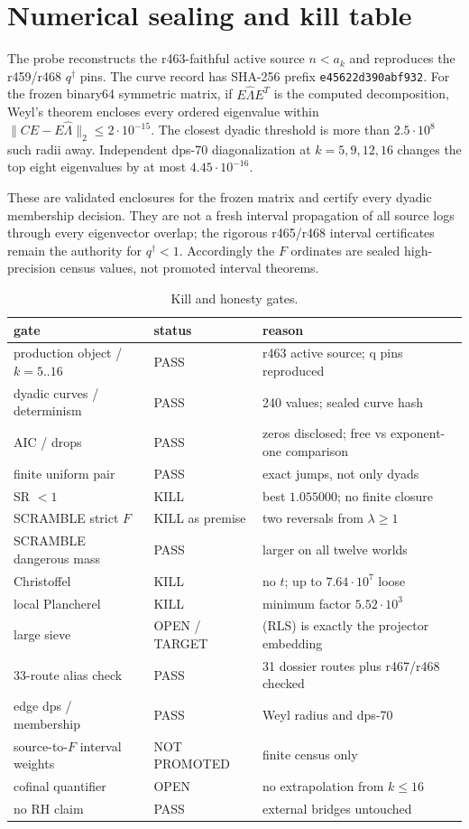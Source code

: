 \documentclass[11pt]{article}
\theoremstyle{remark}
\newcommand{\code}[1]{\nolinkurl{#1}}
\newcommand{\qdag}{q^\dagger}
\begin{document}
\section{Numerical sealing and kill table}

The probe reconstructs the r463-faithful active source $n<a_k$ and
reproduces the r459/r468 $\qdag$ pins.  The curve record has SHA-256
prefix \code{e45622d390abf932}.  For the frozen binary64 symmetric
matrix, if $E\widehat\Lambda E^T$ is the computed decomposition, Weyl's
theorem encloses every ordered eigenvalue within
$\|CE-E\widehat\Lambda\|_2\le2\cdot10^{-15}$.  The closest dyadic
threshold is more than $2.5\cdot10^8$ such radii away.  Independent
dps-70 diagonalization at $k=5,9,12,16$ changes the top eight
eigenvalues by at most $4.45\cdot10^{-16}$.

These are validated enclosures for the frozen matrix and certify every
dyadic membership decision.  They are not a fresh interval propagation
of all source logs through every eigenvector overlap; the rigorous
r465/r468 interval certificates remain the authority for $\qdag<1$.
Accordingly the $F$ ordinates are sealed high-precision census values,
not promoted interval theorems.

\begin{table}[ht]
\centering\small
\caption{Kill and honesty gates.}
\begin{tabular}{@{}lll@{}}
\toprule
gate&status&reason\\
\midrule
production object / $k=5..16$&PASS&r463 active source; q pins reproduced\\
dyadic curves / determinism&PASS&240 values; sealed curve hash\\
AIC / drops&PASS&zeros disclosed; free vs exponent-one comparison\\
finite uniform pair&PASS&exact jumps, not only dyads\\
SR $<1$&KILL&best $1.055000$; no finite closure\\
SCRAMBLE strict $F$&KILL as premise&two reversals from $\lambda\ge1$\\
SCRAMBLE dangerous mass&PASS&larger on all twelve worlds\\
Christoffel&KILL&no $t$; up to $7.64\cdot10^7$ loose\\
local Plancherel&KILL&minimum factor $5.52\cdot10^3$\\
large sieve&OPEN / TARGET&(RLS) is exactly the projector embedding\\
33-route alias check&PASS&31 dossier routes plus r467/r468 checked\\
edge dps / membership&PASS&Weyl radius and dps-70\\
source-to-$F$ interval weights&NOT PROMOTED&finite census only\\
cofinal quantifier&OPEN&no extrapolation from $k\le16$\\
no RH claim&PASS&external bridges untouched\\
\bottomrule
\end{tabular}
\end{table}
\end{document}

